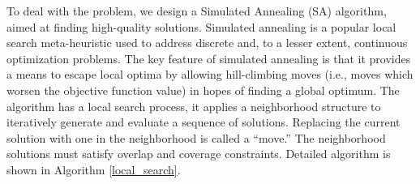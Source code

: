 To deal with the problem, we design a Simulated Annealing (SA)
algorithm, aimed at finding high-quality solutions.
Simulated annealing is a popular local search meta-heuristic used to address
discrete and, to a lesser extent, continuous optimization problems.
The key feature of simulated annealing is that it provides a means to escape local
optima by allowing hill-climbing moves (i.e., moves which worsen the
objective function value) in hopes of finding a global
optimum\cite{henderson2003theory}.
The algorithm has a local search process, it applies a neighborhood
structure to iteratively generate and evaluate a sequence of solutions.
Replacing the current solution with one in the neighborhood is
called a ``move.'' The neighborhood solutions must
satisfy overlap and coverage constraints.
Detailed algorithm is shown in Algorithm \ref{local_search}.

